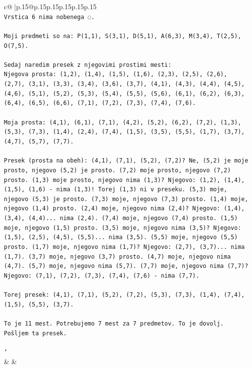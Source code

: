 \documentclass{article}
\begin{document}
{\begin{supertabular}{c@{$\;$}|p{.15\linewidth}@{}p{.15\linewidth}p{.15\linewidth}p{.15\linewidth}p{.15\linewidth}p{.15\linewidth}}
{{{\\ 
\texttt{Vrstica 6 nima nobenega ◌.} \\
\\ 
\texttt{Moji predmeti so na: P(1,1), S(3,1), D(5,1), A(6,3), M(3,4), T(2,5), O(7,5).} \\
\\ 
\texttt{Sedaj naredim presek z njegovimi prostimi mesti:} \\
\texttt{Njegova prosta: (1,2), (1,4), (1,5), (1,6), (2,3), (2,5), (2,6), (2,7), (3,1), (3,3), (3,4), (3,6), (3,7), (4,1), (4,3), (4,4), (4,5), (4,6), (5,1), (5,2), (5,3), (5,4), (5,5), (5,6), (6,1), (6,2), (6,3), (6,4), (6,5), (6,6), (7,1), (7,2), (7,3), (7,4), (7,6).} \\
\\ 
\texttt{Moja prosta: (4,1), (6,1), (7,1), (4,2), (5,2), (6,2), (7,2), (1,3), (5,3), (7,3), (1,4), (2,4), (7,4), (1,5), (3,5), (5,5), (1,7), (3,7), (4,7), (5,7), (7,7).} \\
\\ 
\texttt{Presek (prosta na obeh): (4,1), (7,1), (5,2), (7,2)? Ne, (5,2) je moje prosto, njegovo (5,2) je prosto. (7,2) moje prosto, njegovo (7,2) prosto. (1,3) moje prosto, njegovo nima (1,3)? Njegovo: (1,2), (1,4), (1,5), (1,6) {-} nima (1,3)! Torej (1,3) ni v preseku. (5,3) moje, njegovo (5,3) je prosto. (7,3) moje, njegovo (7,3) prosto. (1,4) moje, njegovo (1,4) prosto. (2,4) moje, njegovo nima (2,4)? Njegovo: (1,4), (3,4), (4,4)... nima (2,4). (7,4) moje, njegovo (7,4) prosto. (1,5) moje, njegovo (1,5) prosto. (3,5) moje, njegovo nima (3,5)? Njegovo: (1,5), (2,5), (4,5), (5,5)... nima (3,5). (5,5) moje, njegovo (5,5) prosto. (1,7) moje, njegovo nima (1,7)? Njegovo: (2,7), (3,7)... nima (1,7). (3,7) moje, njegovo (3,7) prosto. (4,7) moje, njegovo nima (4,7). (5,7) moje, njegovo nima (5,7). (7,7) moje, njegovo nima (7,7)? Njegovo: (7,1), (7,2), (7,3), (7,4), (7,6) {-} nima (7,7).} \\
\\ 
\texttt{Torej presek: (4,1), (7,1), (5,2), (7,2), (5,3), (7,3), (1,4), (7,4), (1,5), (5,5), (3,7).} \\
\\ 
\texttt{To je 11 mest. Potrebujemo 7 mest za 7 predmetov. To je dovolj. Pošljem ta presek.} \\
\\ 
\texttt{'} \\
            }
        }
    }
    & & \\ \\


\end{supertabular}}
\end{document}
